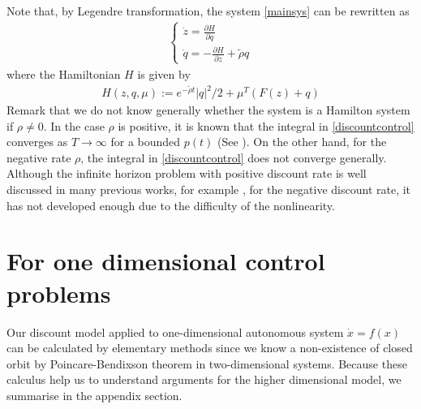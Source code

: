 \documentclass[11pt,reqno]{amsart}
\begin{document}
Note that, by Legendre transformation, the system \eqref{mainsys} can be rewritten as
\begin{eqnarray}
\begin{cases}
\dot{z}=\frac{\partial H}{\partial q}\\
\dot{q}=-\frac{\partial H}{\partial z}+\tilde{\rho} q
\end{cases}
\end{eqnarray}
where the Hamiltonian $H$ is given by
\begin{eqnarray}
H(z,q,\mu):=e^{-\tilde{\rho}t}|q|^2/2+\mu^T(F(z)+q)\nonumber
\end{eqnarray}
Remark that we do not know generally whether the system is a Hamilton system if $\rho\neq 0$. In the case $\rho$ is positive, it is known that the integral in \eqref{discountcontrol} converges as $T\to\infty$ for a bounded $p(t)$ (See \cite{Carlson}). On the other hand, for the negative rate $\rho$, the integral in \eqref{discountcontrol} does not converge generally. Although the infinite horizon problem with positive discount rate is well discussed in many previous works, for example \cite{Kamien, Carlson, Aseev1}, for the negative discount rate, it has not developed enough due to the difficulty of the nonlinearity.






\section{For one dimensional control problems}\label{appB}

Our discount model applied to one-dimensional autonomous system $\dot{x}=f(x)$ can be calculated by elementary methods since we know a non-existence of closed orbit by Poincare-Bendixson theorem in two-dimensional systems. Because these calculus help us to understand arguments for the higher dimensional model, we summarise in the appendix section.
\end{document}
